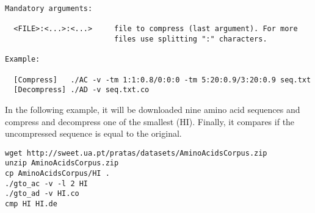 \begin{lstlisting}
Mandatory arguments:                                                   
                                                                       
  <FILE>:<...>:<...>     file to compress (last argument). For more    
                         files use splitting ":" characters.         
                                                                       
Example:                                                               
                                                                       
  [Compress]   ./AC -v -tm 1:1:0.8/0:0:0 -tm 5:20:0.9/3:20:0.9 seq.txt 
  [Decompress] ./AD -v seq.txt.co  
\end{lstlisting}
In the following example, it will be downloaded nine amino acid sequences and compress and decompress one of the smallest (HI). Finally, it compares if the uncompressed sequence is equal to the original.
\begin{lstlisting}
wget http://sweet.ua.pt/pratas/datasets/AminoAcidsCorpus.zip
unzip AminoAcidsCorpus.zip
cp AminoAcidsCorpus/HI .
./gto_ac -v -l 2 HI
./gto_ad -v HI.co
cmp HI HI.de
\end{lstlisting}